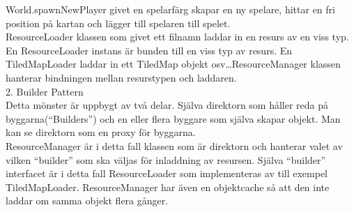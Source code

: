 World.spawnNewPlayer givet en spelarfärg skapar en ny spelare, hittar en fri position på kartan och lägger till spelaren till spelet.\\
ResourceLoader klassen som givet ett filnamn laddar in en resurs av en viss typ. En ResourceLoader instans är bunden till en viss typ av resurs. En TiledMapLoader laddar in ett TiledMap objekt osv\ldots ResourceManager klassen hanterar bindningen mellan resurstypen och laddaren.\\
\vspace{11pt}
2. Builder Pattern\\
Detta mönster är uppbygt av två delar. Själva direktorn som håller reda på byggarna(``Builders'') och en eller flera byggare som själva skapar objekt. Man kan se direktorn som en proxy för byggarna.\\
ResourceManager är i detta fall klassen som är direktorn och hanterar valet av vilken ``builder'' som ska väljas för inladdning av resursen. Själva ``builder'' interfacet är i detta fall ResourceLoader som implementeras av till exempel TiledMapLoader. ResourceManager har även en objektcache så att den inte laddar om samma objekt flera gånger.\\
